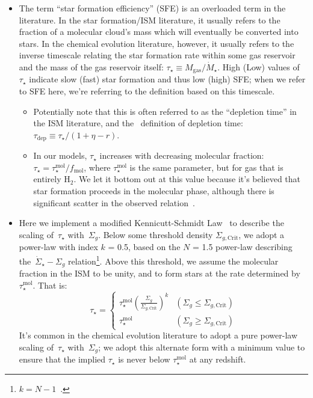 \documentclass[a4paper, fleqn, usenatbib, useAMS]{mnras}
\begin{document}
\begin{itemize} 
	\item The term ``star formation efficiency'' (SFE) is an overloaded term in 
	the literature. In the star formation/ISM literature, it usually refers to 
	the fraction of a molecular cloud's mass which will eventually be converted 
	into stars. In the chemical evolution literature, however, it usually 
	refers to the inverse timescale relating the star formation rate within 
	some gas reservoir and the mass of the gas reservoir itself: 
	$\tau_\star \equiv M_\text{gas}/\dot{M}_\star$. High (Low) values of 
	$\tau_\star$ indicate slow (fast) star formation and thus low (high) SFE; 
	when we refer to SFE here, we're referring to the definition based on this 
	timescale. 
	\begin{itemize} 
		\item Potentially note that this is often referred to as the 
		``depletion time'' in the ISM literature, and the~\citet{Weinberg2017} 
		definition of depletion 
		time:~$\tau_\text{dep} \equiv \tau_\star/ (1 + \eta - r)$. 

		\item In our models, $\tau_\star$ increases with decreasing molecular 
		fraction: $\tau_\star = \tau_\star^\text{mol}/f_\text{mol}$, where 
		$\tau_\star^\text{mol}$ is the same parameter, but for gas that is 
		entirely H$_2$. We let it bottom out at this value because it's 
		believed that star formation proceeds in the molecular phase, although 
		there is significant scatter in the observed relation~\citep[e.g.][]{
		Leroy2008, Kennicutt2012, Tacconi2018}. 
	\end{itemize} 

	\item Here we implement a modified Kennicutt-Schmidt Law~\citep{Schmidt1959, 
	Schmidt1963, Kennicutt1998} to describe the scaling of~$\tau_\star$ 
	with~$\Sigma_g$. Below some threshold density $\Sigma_{g,\text{Crit}}$, we 
	adopt a power-law with index $k$ = 0.5, based on the $N$ = 1.5 power-law 
	describing the~$\dot{\Sigma}_\star-\Sigma_g$ relation\footnote{
		$k = N - 1$~\citep{Johnson2020}. 
	}. Above this threshold, we assume the molecular fraction in the ISM to be 
	unity, and to form stars at the rate determined by $\tau_\star^\text{mol}$. 
	That is: 
	\begin{equation} 
	\tau_\star = \begin{cases} 
	\tau_\star^\text{mol}\left(\frac{\Sigma_g}{\Sigma_{g,\text{Crit}}}\right)^k 
	& (\Sigma_g \leq \Sigma_{g,\text{Crit}}) \\ 
	\tau_\star^\text{mol} & (\Sigma_g \geq \Sigma_{g,\text{Crit}}) 
	\end{cases} 
	\end{equation} 
	It's common in the chemical evolution literature to adopt a pure power-law 
	scaling of~$\tau_\star$ with~$\Sigma_g$; we adopt this alternate form with 
	a minimum value to ensure that the implied $\tau_\star$ is never below 
	$\tau_\star^\text{mol}$ at any redshift. 


\end{itemize}
\end{document}
